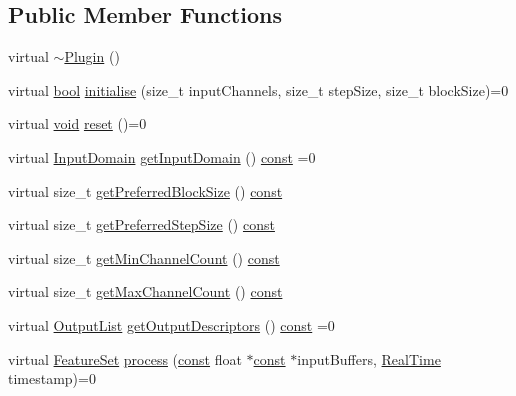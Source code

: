 \subsection*{Public Member Functions}
\begin{DoxyCompactItemize}
\item 
virtual \hyperlink{class_vamp_1_1_plugin_a42d3096f9c1f58b1876024cd8d9ab80b}{$\sim$\+Plugin} ()
\item 
virtual \hyperlink{mac_2config_2i386_2lib-src_2libsoxr_2soxr-config_8h_abb452686968e48b67397da5f97445f5b}{bool} \hyperlink{class_vamp_1_1_plugin_af26212cf5fc511b603a8b48034247822}{initialise} (size\+\_\+t input\+Channels, size\+\_\+t step\+Size, size\+\_\+t block\+Size)=0
\item 
virtual \hyperlink{sound_8c_ae35f5844602719cf66324f4de2a658b3}{void} \hyperlink{class_vamp_1_1_plugin_aad67dc9d0052417511070c4ebcfbf24f}{reset} ()=0
\item 
virtual \hyperlink{class_vamp_1_1_plugin_a39cb7649d6dcc20e4cb1640cd55907bc}{Input\+Domain} \hyperlink{class_vamp_1_1_plugin_adfbdde456a19b4751dfa65dfa72e5458}{get\+Input\+Domain} () \hyperlink{getopt1_8c_a2c212835823e3c54a8ab6d95c652660e}{const}  =0
\item 
virtual size\+\_\+t \hyperlink{class_vamp_1_1_plugin_aa529adf83f87a603954eb31407602aac}{get\+Preferred\+Block\+Size} () \hyperlink{getopt1_8c_a2c212835823e3c54a8ab6d95c652660e}{const} 
\item 
virtual size\+\_\+t \hyperlink{class_vamp_1_1_plugin_a514c716c22f81c055f19b56c3f882567}{get\+Preferred\+Step\+Size} () \hyperlink{getopt1_8c_a2c212835823e3c54a8ab6d95c652660e}{const} 
\item 
virtual size\+\_\+t \hyperlink{class_vamp_1_1_plugin_a267b42e866df3cf0d190893e8096f525}{get\+Min\+Channel\+Count} () \hyperlink{getopt1_8c_a2c212835823e3c54a8ab6d95c652660e}{const} 
\item 
virtual size\+\_\+t \hyperlink{class_vamp_1_1_plugin_a2c5ab12b6fa4847cb244bd1e9cb3ae5e}{get\+Max\+Channel\+Count} () \hyperlink{getopt1_8c_a2c212835823e3c54a8ab6d95c652660e}{const} 
\item 
virtual \hyperlink{class_vamp_1_1_plugin_a30f531b8fb69fac41a24e3d2a6a08ed9}{Output\+List} \hyperlink{class_vamp_1_1_plugin_a37b9f286c79c0d682c7fdfddaebf732a}{get\+Output\+Descriptors} () \hyperlink{getopt1_8c_a2c212835823e3c54a8ab6d95c652660e}{const}  =0
\item 
virtual \hyperlink{class_vamp_1_1_plugin_a448fb57dc245d47923ec9eeaf9856c5f}{Feature\+Set} \hyperlink{class_vamp_1_1_plugin_ae4aed3bebfe80a2e2fccd3d37af26996}{process} (\hyperlink{getopt1_8c_a2c212835823e3c54a8ab6d95c652660e}{const} float $\ast$\hyperlink{getopt1_8c_a2c212835823e3c54a8ab6d95c652660e}{const} $\ast$input\+Buffers, \hyperlink{struct_vamp_1_1_real_time}{Real\+Time} timestamp)=0

\end{DoxyCompactItemize}
